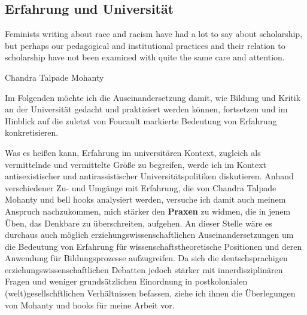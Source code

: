 \subsection{Erfahrung und Universität}
\epigraph{ 
 Feminists writing about race and racism have had a lot to 
say about scholarship, but perhaps our pedagogical and institutional practices and their relation to scholarship have not been examined with quite the same care and attention. 
  }{Chandra Talpade Mohanty\footnotemark}  

Im Folgenden möchte ich die Auseinandersetzung damit, wie Bildung und Kritik
an der Universität gedacht und praktiziert werden können, fortsetzen und im
Hinblick auf die zuletzt von Foucault markierte Bedeutung von Erfahrung
konkretisieren.

Was es heißen kann, Erfahrung im universitären Kontext, zugleich als
vermittelnde und vermittelte Größe zu begreifen, werde ich im Kontext
antisexistischer und antirassistischer Universitätspolitiken diskutieren.
Anhand verschiedener Zu- und Umgänge mit Erfahrung, die von Chandra Talpade
Mohanty und bell hooks analysiert werden, versuche ich damit auch meinem
Anspruch nachzukommen, mich stärker den \textbf{Praxen} zu widmen, die in jenem Üben,
das Denkbare zu überschreiten, aufgehen. An dieser Stelle wäre es durchaus auch
möglich  erziehungswissenschaftlichen Auseinandersetzungen um die Bedeutung von
Erfahrung für wissenschaftstheoretische Positionen und deren Anwendung für
Bildungsprozesse  aufzugreifen. Da sich die deutschsprachigen
erziehungswissenschaftlichen Debatten\footnotemark {} jedoch stärker mit innerdisziplinären Fragen und
weniger grundsätzlichen Einordnung in postkolonialen (welt)gesellschftlichen
Verhältnissen befassen, ziehe ich ihnen die Überlegungen von  Mohanty und hooks
für meine Arbeit vor.

